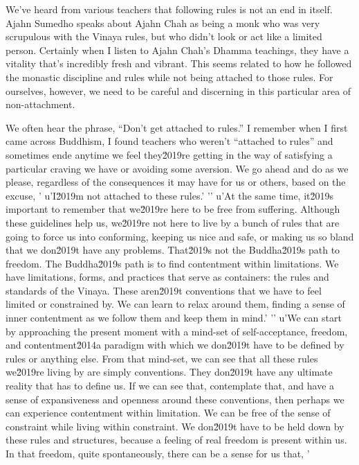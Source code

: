 We've heard from various teachers that following rules is not an end in 
itself. Ajahn Sumedho speaks about Ajahn Chah as being a monk who was 
very scrupulous with the Vinaya rules, but who didn't look or act like 
a limited person. Certainly when I listen to Ajahn Chah's Dhamma 
teachings, they have a vitality that's incredibly fresh and vibrant. 
This seems related to how he followed the monastic discipline and rules 
while not being attached to those rules. For ourselves, however, we 
need to be careful and discerning in this particular area of 
non-attachment.

We often hear the phrase, ``Don't get attached to rules.'' I remember 
when I first came across Buddhism, I found teachers who weren't 
``attached to rules'' and sometimes ende anytime we feel they\u2019re getting in the way of satisfying a particular craving we have or avoiding some aversion. We go ahead and do as we please, regardless of the consequences it may have for us or others, based on the excuse, '
u'I\u2019m not attached to these rules.'
'\n'
u'At the same time, it\u2019s important to remember that we\u2019re here to be free from suffering. Although these guidelines help us, we\u2019re not here to live by a bunch of rules that are going to force us into conforming, keeping us nice and safe, or making us so bland that we don\u2019t have any problems. That\u2019s not the Buddha\u2019s path to freedom. The Buddha\u2019s path is to find contentment within limitations. We have limitations, forms, and practices that serve as containers: the rules and standards of the Vinaya. These aren\u2019t conventions that we have to feel limited or constrained by. We can learn to relax around them, finding a sense of inner contentment as we follow them and keep them in mind.'
'\n'
u'We can start by approaching the present moment with a mind-set of self-acceptance, freedom, and contentment\u2014a paradigm with which we don\u2019t have to be defined by rules or anything else. From that mind-set, we can see that all these rules we\u2019re living by are simply conventions. They don\u2019t have any ultimate reality that has to define us. If we can see that, contemplate that, and have a sense of expansiveness and openness around these conventions, then perhaps we can experience contentment within limitation. We can be free of the sense of constraint while living within constraint. We don\u2019t have to be held down by these rules and structures, because a feeling of real freedom is present within us. In that freedom, quite spontaneously, there can be a sense for us that, '
